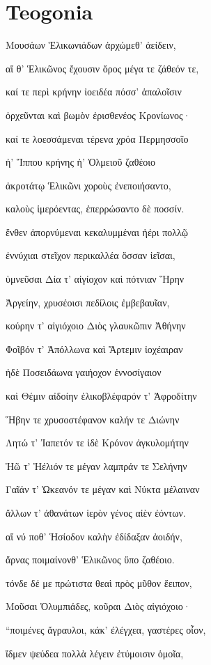 \part{Teogonia}


\begin{pages}
    \begin{Leftside}
        \beginnumbering
            \pstart
\Porson
                Μουσάων Ἑλικωνιάδων ἀρχώμεθ' ἀείδειν,

αἵ θ' Ἑλικῶνος ἔχουσιν ὄρος μέγα τε ζάθεόν τε, 

καί τε περὶ κρήνην ἰοειδέα πόσσ' ἁπαλοῖσιν

ὀρχεῦνται καὶ βωμὸν ἐρισθενέος Κρονίωνος·

καί τε λοεσσάμεναι τέρενα χρόα Περμησσοῖο 

ἠ' Ἵππου κρήνης ἠ' Ὀλμειοῦ ζαθέοιο

ἀκροτάτῳ Ἑλικῶνι χοροὺς ἐνεποιήσαντο,

καλοὺς ἱμερόεντας, ἐπερρώσαντο δὲ ποσσίν.

ἔνθεν ἀπορνύμεναι κεκαλυμμέναι ἠέρι πολλῷ 

ἐννύχιαι στεῖχον περικαλλέα ὄσσαν ἱεῖσαι, 

ὑμνεῦσαι Δία τ' αἰγίοχον καὶ πότνιαν Ἥρην

Ἀργείην, χρυσέοισι πεδίλοις ἐμβεβαυῖαν, 

κούρην τ' αἰγιόχοιο Διὸς γλαυκῶπιν Ἀθήνην

Φοῖβόν τ' Ἀπόλλωνα καὶ Ἄρτεμιν ἰοχέαιραν

ἠδὲ Ποσειδάωνα γαιήοχον ἐννοσίγαιον  

καὶ Θέμιν αἰδοίην ἑλικοβλέφαρόν τ' Ἀφροδίτην

Ἥβην τε χρυσοστέφανον καλήν τε Διώνην

Λητώ τ' Ἰαπετόν τε ἰδὲ Κρόνον ἀγκυλομήτην

Ἠῶ τ' Ἠέλιόν τε μέγαν λαμπράν τε Σελήνην

Γαῖάν τ' Ὠκεανόν τε μέγαν καὶ Νύκτα μέλαιναν 

ἄλλων τ' ἀθανάτων ἱερὸν γένος αἰὲν ἐόντων.

αἵ νύ ποθ' Ἡσίοδον καλὴν ἐδίδαξαν ἀοιδήν,

ἄρνας ποιμαίνονθ' Ἑλικῶνος ὕπο ζαθέοιο.

τόνδε δέ με πρώτιστα θεαὶ πρὸς μῦθον ἔειπον,

Μοῦσαι Ὀλυμπιάδες, κοῦραι Διὸς αἰγιόχοιο·  

``ποιμένες ἄγραυλοι, κάκ' ἐλέγχεα, γαστέρες οἶον,

ἴδμεν ψεύδεα πολλὰ λέγειν ἐτύμοισιν ὁμοῖα,


\end{Leftside}
\end{pages}

